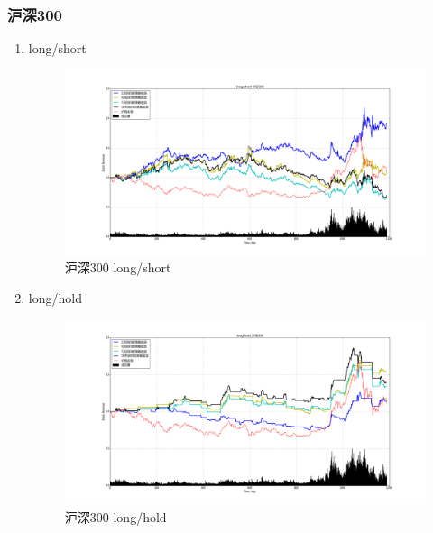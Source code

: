 \documentclass[12pt,a4paper]{article}
\begin{document}
\subsubsection{沪深300}
\begin{enumerate}
\item long/short 
\begin{figure}[H]
	\centering
	\includegraphics[width=1.0\textwidth]{img_r_10/hs300.png}
	\caption{沪深300 long/short }
\end{figure}
\item long/hold 
\begin{figure}[H]
	\centering
	\includegraphics[width=1.0\textwidth]{img_r_10/hs300_1.png}
	\caption{沪深300 long/hold }
\end{figure}
\end{enumerate}
\end{document}
